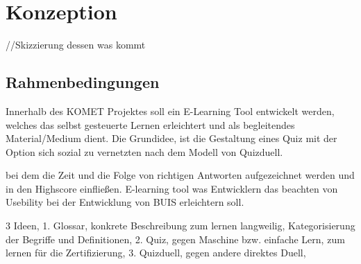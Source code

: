 \documentclass[a4paper, 12pt, twoside, BCOR=20mm, DIV=calc, abstracton, parskip=half*, toc=bibliography, toc=listof, headsepline, footsepline, headings=small, numbers=enddot]{scrreprt}
\begin{document}
	
	\chapter{Konzeption} //Skizzierung dessen was kommt 

	\section{Rahmenbedingungen}
	Innerhalb des KOMET Projektes soll ein E-Learning Tool entwickelt werden, welches das selbst gesteuerte Lernen erleichtert und als begleitendes Material/Medium dient. 
	Die Grundidee, ist die Gestaltung eines Quiz mit der Option sich sozial zu vernetzten nach dem Modell von Quizduell. 
	
	 bei dem die Zeit und die Folge von richtigen Antworten aufgezeichnet werden und in den Highscore einfließen.
	E-learning tool was Entwicklern das beachten von Usebility bei der Entwicklung von BUIS erleichtern soll.  
	
	
	3 Ideen, 
	1. Glossar, konkrete Beschreibung zum lernen langweilig, Kategorisierung der Begriffe und Definitionen, 
	2. Quiz, gegen Maschine bzw. einfache Lern, zum lernen für die Zertifizierung,
	3. Quizduell, gegen andere direktes Duell, 
	
\end{document}
